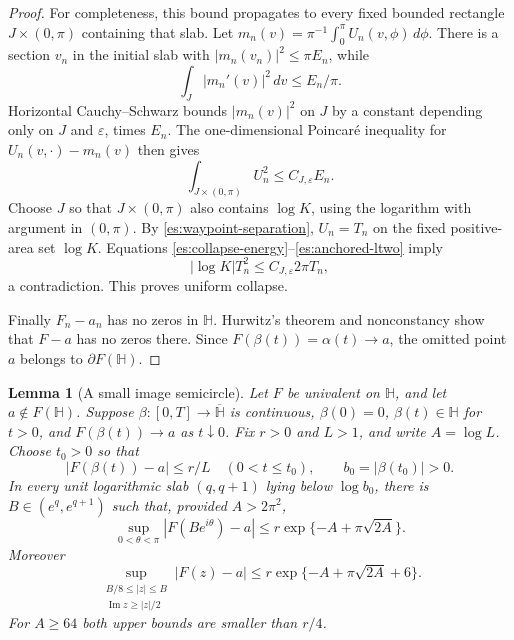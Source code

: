 \documentclass[11pt]{article}
\newtheorem{lemma}[theorem]{Lemma}
\theoremstyle{definition}
\theoremstyle{remark}
\numberwithin{equation}{section}
\begin{document}
\begin{proof}
For completeness, this bound propagates to every fixed bounded
rectangle $J\times(0,\pi)$ containing that slab.  Let
$m_n(v)=\pi^{-1}\int_0^\pi U_n(v,\phi)\,d\phi$.
There is a section $v_n$ in the initial slab with
$|m_n(v_n)|^2\le\pi E_n$, while
\[
 \int_J|m_n'(v)|^2\,dv\le E_n/\pi.
\]
Horizontal Cauchy--Schwarz bounds $|m_n(v)|^2$ on $J$ by a constant
depending only on $J$ and $\varepsilon$, times $E_n$.
The one-dimensional Poincar\'e inequality for
$U_n(v,\cdot)-m_n(v)$ then gives
\begin{equation}\label{es:anchored-ltwo}
 \int_{J\times(0,\pi)}U_n^2\le C_{J,\varepsilon}E_n.
\end{equation}
Choose $J$ so that $J\times(0,\pi)$ also contains $\log K$, using the
logarithm with argument in $(0,\pi)$.  By
\eqref{es:waypoint-separation}, $U_n=T_n$ on the
fixed positive-area set $\log K$.  Equations
\eqref{es:collapse-energy}--\eqref{es:anchored-ltwo} imply
\[
 |\log K|T_n^2\le C_{J,\varepsilon}2\pi T_n,
\]
a contradiction.  This proves uniform collapse.

Finally $F_n-a_n$ has no zeros in $\mathbb H$.  Hurwitz's theorem and
nonconstancy show that $F-a$ has no zeros there.  Since
$F(\beta(t))=\alpha(t)\to a$, the omitted point $a$ belongs to
$\partial F(\mathbb H)$.
\end{proof}

\begin{lemma}[A small image semicircle]\label{es:good-semicircle}
Let $F$ be univalent on $\mathbb H$, and let $a\notin F(\mathbb H)$.
Suppose $\beta:[0,T]\to\overline{\mathbb H}$ is continuous,
$\beta(0)=0$, $\beta(t)\in\mathbb H$ for $t>0$, and
$F(\beta(t))\to a$ as $t\downarrow0$.
Fix $r>0$ and $L>1$, and write $A=\log L$.  Choose $t_0>0$ so that
\[
 |F(\beta(t))-a|\le r/L\quad(0<t\le t_0),
 \qquad b_0=|\beta(t_0)|>0.
\]
In every unit logarithmic slab $(q,q+1)$ lying below $\log b_0$,
there is $B\in(e^q,e^{q+1})$ such that, provided $A>2\pi^2$,
\begin{equation}\label{es:semicircle-bound}
 \sup_{0<\theta<\pi}|F(Be^{i\theta})-a|
       \le r\exp\{-A+\pi\sqrt{2A}\}.
\end{equation}
Moreover
\begin{equation}\label{es:sector-bound}
 \sup_{\substack{B/8\le|z|\le B\\
                 \operatorname{Im}z\ge |z|/2}}
 |F(z)-a|
       \le r\exp\{-A+\pi\sqrt{2A}+6\}.
\end{equation}
For $A\ge64$ both upper bounds are smaller than $r/4$.
\end{lemma}
\end{document}
